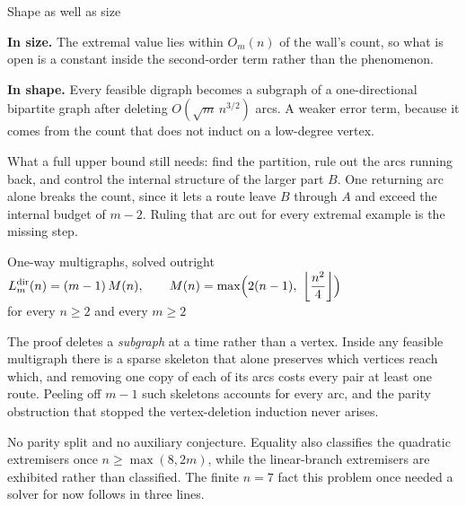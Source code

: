 \documentclass[aspectratio=1610,11pt]{beamer}
\begin{document}
\begin{frame}{Shape as well as size}
\vfill
\centering
\begin{minipage}{0.88\textwidth}
{\color{KULblauw1}\bfseries In size.} {\small The extremal value lies within $O_m(n)$ of the wall's count, so what is open is a constant inside the second-order term rather than the phenomenon.}

\vspace{16pt}
{\color{KULblauw1}\bfseries In shape.} {\small Every feasible digraph becomes a subgraph of a one-directional bipartite graph after deleting $O(\sqrt{m}\,n^{3/2})$ arcs. A weaker error term, because it comes from the count that does not induct on a low-degree vertex.}
\end{minipage}

\vspace{24pt}
\begin{minipage}{0.88\textwidth}
{\footnotesize\color{black!60} What a full upper bound still needs: find the partition, rule out the arcs running back, and control the internal structure of the larger part $B$. One returning arc alone breaks the count, since it lets a route leave $B$ through $A$ and exceed the internal budget of $m-2$. Ruling that arc out for every extremal example is the missing step.}
\end{minipage}
\vfill
\end{frame}

\begin{frame}{One-way multigraphs, solved outright}
\vfill
\centering
{\color{KULblauw1}\Large $\displaystyle L_m^{\mathrm{dir}}(n)=(m-1)\,M(n), \qquad M(n)=\max\Bigl(2(n-1),\ \left\lfloor \frac{n^2}{4}\right\rfloor\Bigr)$}\\[6pt]
{\color{black!45}\small for every $n\ge2$ and every $m\ge2$}

\vspace{22pt}
\begin{minipage}{0.88\textwidth}
{\small The proof deletes a \emph{subgraph} at a time rather than a vertex. Inside any feasible multigraph there is a sparse skeleton that alone preserves which vertices reach which, and removing one copy of each of its arcs costs every pair at least one route. Peeling off $m-1$ such skeletons accounts for every arc, and the parity obstruction that stopped the vertex-deletion induction never arises.}

\vspace{14pt}
{\footnotesize\color{black!60} No parity split and no auxiliary conjecture. Equality also classifies the quadratic extremisers once $n\ge\max(8,2m)$, while the linear-branch extremisers are exhibited rather than classified. The finite $n=7$ fact this problem once needed a solver for now follows in three lines.}
\end{minipage}
\vfill
\end{frame}
\end{document}
